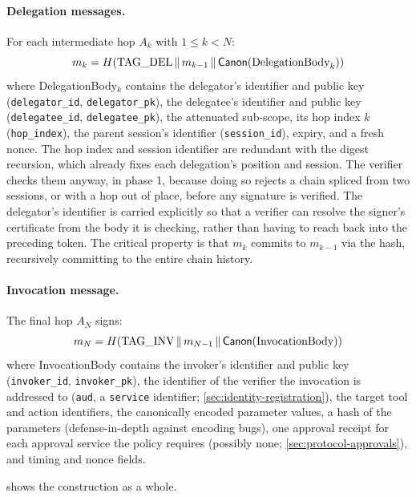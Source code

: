 \documentclass[11pt,a4paper]{article}
\begin{document}
\paragraph{Delegation messages.}
For each intermediate hop $A_k$ with $1 \le k < N$:
\begin{equation}
m_k = H(\text{TAG\_DEL} \,\|\, m_{k-1} \,\|\, \mathsf{Canon}(\text{DelegationBody}_k))
\end{equation}
where DelegationBody$_k$ contains the delegator's identifier and public
key (\texttt{delegator\_id}, \texttt{delegator\_pk}), the delegatee's
identifier and public key (\texttt{delegatee\_id},
\texttt{delegatee\_pk}), the attenuated sub-scope, its hop index $k$
(\texttt{hop\_index}), the parent session's identifier
(\texttt{session\_id}), expiry, and a fresh nonce. The hop index and
session identifier are redundant with the digest recursion, which
already fixes each delegation's position and session. The verifier
checks them anyway, in phase 1, because doing so rejects a chain spliced
from two sessions, or with a hop out of place, before any signature is
verified. The delegator's
identifier is carried explicitly so that a verifier can resolve the
signer's certificate from the body it is checking, rather than having
to reach back into the preceding token. The critical property is that
$m_k$ commits to $m_{k-1}$ via the hash, recursively committing to the
entire chain history.

\paragraph{Invocation message.}
The final hop $A_N$ signs:
\begin{equation}
m_N = H(\text{TAG\_INV} \,\|\, m_{N-1} \,\|\, \mathsf{Canon}(\text{InvocationBody}))
\end{equation}
where InvocationBody contains the invoker's identifier and public key
(\texttt{invoker\_id}, \texttt{invoker\_pk}), the identifier of the
verifier the invocation is addressed to (\texttt{aud}, a
\texttt{service} identifier; \cref{sec:identity-registration}), the
target tool
and action identifiers, the canonically encoded parameter values, a
hash of the parameters (defense-in-depth against encoding bugs), one
approval receipt for each approval service the policy requires (possibly
none; \cref{sec:protocol-approvals}), and timing and nonce fields.

 shows the construction as a whole.
\end{document}
